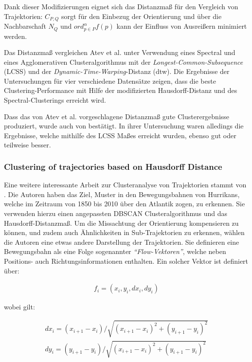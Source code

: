 Dank dieser Modifizierungen eignet sich das Distanzmaß für den Vergleich von Trajektorien:
$C_{P,Q}$ sorgt für den Einbezug der Orientierung und über die Nachbarschaft $N_Q$ und $ord_{p \in P}^{\alpha} f(p)$
kann der Einfluss von Ausreißern minimiert werden.

Das Distanzmaß vergleichen Atev et al. unter Verwendung eines Spectral und eines Agglomerativen
Clusteralgorithmus mit der \textit{Longest-Common-Subsequence} (LCSS) und der \textit{Dynamic-Time-Warping}-Distanz (\acrshort*{dtw}).
Die Ergebnisse der Untersuchungen für vier verschiedene Datensätze zeigen, dass die beste Clustering-Performance
mit Hilfe der modifizierten Hausdorff-Distanz und des Spectral-Clusterings erreicht wird.

Dass das von Atev et al. vorgeschlagene Distanzmaß gute Clusterergebnisse produziert, wurde auch von \cite[]{Morris2009}
bestätigt. In ihrer Untersuchung waren alledings die Ergebnisse, welche mithilfe des LCSS Maßes erreicht wurden,
ebenso gut oder teilweise besser.

\subsubsection*{Clustering of trajectories based on Hausdorff Distance}
Eine weitere interessante Arbeit zur Clusteranalyse von Trajektorien stammt von \cite[]{Chen2011}.
Die Autoren haben das Ziel, Muster in den Bewegungsbahnen von Hurrikans, welche im Zeitraum von 1850 bis 2010
über den Atlantik zogen, zu erkennen.
Sie verwenden hierzu einen angepassten DBSCAN Clusteralgorithmus und das Hausdorff-Distanzmaß.
Um die Missachtung der Orientierung kompensieren zu können, und zudem auch Ähnlichkeiten
in Sub-Trajektorien zu erkennen, wählen die Autoren eine etwas andere Darstellung der Trajektorien.
Sie definieren eine Bewegungsbahn als eine Folge sogenannter \textit{``Flow-Vektoren''}, welche neben
Positions- auch Richtungsinformationen enthalten. Ein solcher Vektor ist definiert über:

\begin{ceqn}
\begin{align}
    f_i = (x_i, y_i, dx_i, dy_i)
\end{align}
\end{ceqn}

wobei gilt:

\begin{ceqn}
\begin{align}
    dx_i = (x_{i+1} - x_i)/\sqrt{(x_{i+1} - x_i)^2 + (y_{i+1} - y_i)^2} \\
    dy_i = (y_{i+1} - y_i)/\sqrt{(x_{i+1} - x_i)^2 + (y_{i+1} - y_i)^2}
\end{align}
\end{ceqn}

